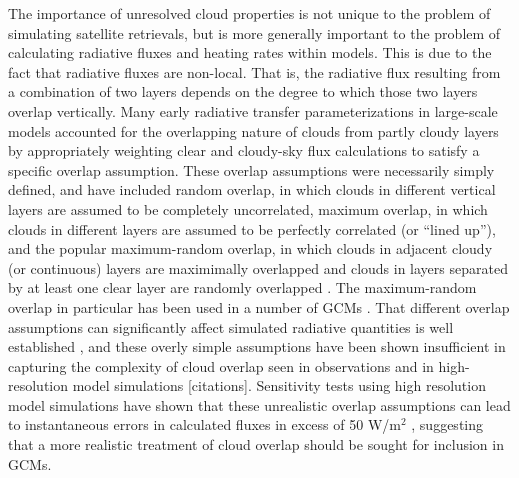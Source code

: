 The importance of unresolved cloud properties is not unique to the problem of simulating satellite retrievals, but is more generally important to the problem of calculating radiative fluxes and heating rates within models. This is due to the fact that radiative fluxes are non-local. That is, the radiative flux resulting from a combination of two layers depends on the degree to which those two layers overlap vertically. %
Many early radiative transfer parameterizations in large-scale models accounted for the overlapping nature of clouds from partly cloudy layers by appropriately weighting clear and cloudy-sky flux calculations to satisfy a specific overlap assumption. These overlap assumptions were necessarily simply defined, and have included random overlap, in which clouds in different vertical layers are assumed to be completely uncorrelated, maximum overlap, in which clouds in different layers are assumed to be perfectly correlated (or ``lined up''), and the popular maximum-random overlap, in which clouds in adjacent cloudy (or continuous) layers are maximimally overlapped and clouds in layers separated by at least one clear layer are randomly overlapped \citep{geleyn_and_hollingsworth_1979, tian_and_curry_1989}. The maximum-random overlap in particular has been used in a number of GCMs \citep[e.g.,][]{collins_et_al_2004, neale_et_al_2010a, neale_et_al_2010b}. That different overlap assumptions can significantly affect simulated radiative quantities is well established \citep[e.g.,][]{morcrette_and_fouquart_1986, stubenrauch_et_al_1997, barker_et_al_1999}, and these overly simple assumptions have been shown insufficient in capturing the complexity of cloud overlap seen in observations \citep{hogan_and_illingworth_2000, mace_and_benson-troth_2002, barker_2008} and in high-resolution model simulations [citations]. Sensitivity tests using high resolution model simulations have shown that these unrealistic overlap assumptions can lead to instantaneous errors in calculated fluxes in excess of 50 W/m$^2$ \citep{barker_et_al_1999, wu_and_liang_2005}, suggesting that a more realistic treatment of cloud overlap should be sought for inclusion in GCMs. %

